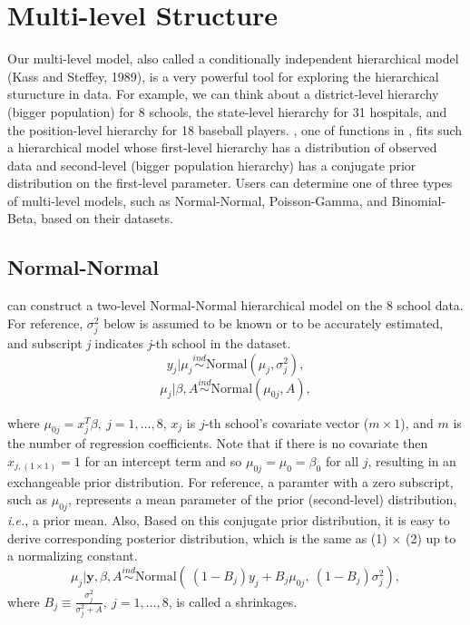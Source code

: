 \documentclass[article]{jss}
\begin{document}
\section[Multi-level Structure]{Multi-level Structure}
Our multi-level model, also called a conditionally independent hierarchical model (Kass and Steffey, 1989), is a very powerful tool for exploring the hierarchical sturucture in data. For example, we can think about a district-level hierarchy (bigger population) for 8 schools, the state-level hierarchy for 31 hospitals, and the position-level hierarchy for 18 baseball players. , one of functions in , fits such a hierarchical model whose first-level hierarchy has a distribution of observed data and second-level (bigger population hierarchy) has a conjugate prior distribution on the first-level parameter. Users can determine one of three types of multi-level models, such as Normal-Normal, Poisson-Gamma, and Binomial-Beta, based on their datasets. 
\\

 
\subsection[Normal-Normal]{Normal-Normal}
 can construct a two-level Normal-Normal hierarchical model on the 8 school data. For reference,  $\sigma^{2}_{j}$ below is assumed to be known or to be accurately estimated, and subscript \emph{j} indicates \emph{j}-th school in the dataset.
\begin{equation}
y_{j}\vert \mu_{j} \stackrel{ind}{\sim}\textrm{Normal}(\mu_{j}, \sigma^{2}_{j}),
\end{equation}
\begin{equation}
\mu_{j}\vert \beta, A\stackrel{ind}{\sim}\textrm{Normal}(\mu_{0j}, A),
\end{equation}

where $\mu_{0j} =x^{T}_{j}\beta,~j=1, \ldots, 8$, $x_{j}$ is $j$-th school's covariate vector ($m\times 1$), and $m$ is the number of regression coefficients. Note that if there is no covariate then $x_{j, (1\times1)}=1$ for an intercept term and so $\mu_{0j}=\mu_{0}=\beta_{0}$ for all $j$, resulting in an exchangeable prior distribution. For reference, a paramter with a zero subscript, such as $\mu_{0j}$, represents a mean parameter of the prior (second-level) distribution, \emph{i.e.}, a prior mean. Also,  Based on this conjugate prior distribution, it is easy to derive corresponding posterior distribution, which is the same as (1) $\times$ (2) up to a normalizing constant.
\begin{equation}
\mu_{j}\vert \textbf{y}, \beta, A \stackrel{ind}{\sim}\textrm{Normal}(~(1-B_{j})y_{j} + B_{j}\mu_{0j},~(1-B_{j})\sigma^{2}_{j}),
\end{equation}
where $B_{j}\equiv\frac{\sigma^{2}_{j}}{\sigma^{2}_{j} + A},~j=1, \ldots, 8$, is called a shrinkages.
\end{document}
